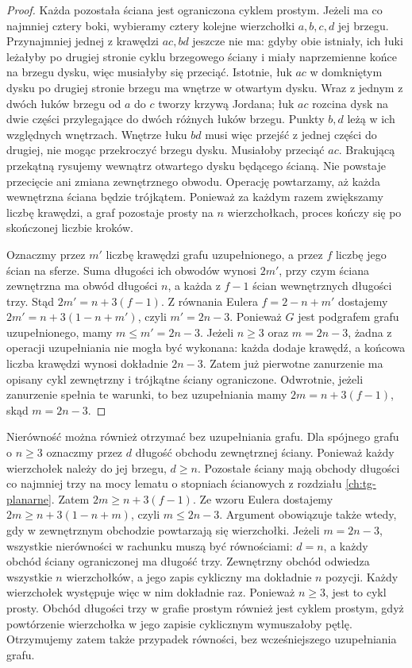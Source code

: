 \begin{proof}
Każda pozostała ściana jest ograniczona cyklem prostym.
Jeżeli ma co najmniej cztery boki, wybieramy cztery
kolejne wierzchołki $a,b,c,d$ jej brzegu.
Przynajmniej jednej z krawędzi $ac,bd$ jeszcze nie ma:
gdyby obie istniały, ich łuki leżałyby po drugiej
stronie cyklu brzegowego ściany i miały naprzemienne
końce na brzegu dysku, więc musiałyby się przeciąć. Istotnie, łuk $ac$
w domkniętym dysku po drugiej stronie brzegu
ma wnętrze w otwartym dysku. Wraz z jednym
z dwóch łuków brzegu od $a$ do $c$ tworzy
krzywą Jordana; łuk $ac$ rozcina dysk na dwie
części przylegające do dwóch różnych łuków
brzegu. Punkty $b,d$ leżą w ich względnych
wnętrzach. Wnętrze łuku $bd$ musi więc przejść
z jednej części do drugiej, nie mogąc przekroczyć
brzegu dysku. Musiałoby przeciąć $ac$. Brakującą przekątną rysujemy
wewnątrz otwartego dysku będącego ścianą. Nie powstaje
przecięcie ani zmiana zewnętrznego obwodu. Operację
powtarzamy, aż każda wewnętrzna ściana będzie trójkątem.
Ponieważ za każdym razem zwiększamy liczbę krawędzi,
a graf pozostaje prosty na $n$ wierzchołkach, proces
kończy się po skończonej liczbie kroków.

Oznaczmy przez $m'$ liczbę krawędzi grafu uzupełnionego,
a przez $f$ liczbę jego ścian na sferze.
Suma długości ich obwodów wynosi $2m'$, przy czym
ściana zewnętrzna ma obwód długości $n$,
a każda z $f-1$ ścian wewnętrznych długości trzy.
Stąd $2m'=n+3(f-1)$.
Z równania Eulera $f=2-n+m'$ dostajemy
$2m'=n+3(1-n+m')$, czyli $m'=2n-3$.
Ponieważ $G$ jest podgrafem grafu uzupełnionego,
mamy $m\leq m'=2n-3$.
Jeżeli $n\ge3$ oraz $m=2n-3$, żadna z operacji
uzupełniania nie mogła być wykonana: każda dodaje
krawędź, a końcowa liczba krawędzi wynosi dokładnie
$2n-3$. Zatem już pierwotne zanurzenie ma opisany
cykl zewnętrzny i trójkątne ściany ograniczone.
Odwrotnie, jeżeli zanurzenie spełnia te warunki,
to bez uzupełniania mamy $2m=n+3(f-1)$, skąd
$m=2n-3$.
\end{proof}

\begin{uwaga}
Nierówność można również otrzymać bez uzupełniania
grafu. Dla spójnego grafu o $n\geq3$ oznaczmy przez
$d$ długość obchodu zewnętrznej ściany. Ponieważ każdy
wierzchołek należy do jej brzegu, $d\geq n$.
Pozostałe ściany mają obchody długości co najmniej trzy
na mocy lematu o stopniach ścianowych z rozdziału
\ref{ch:tg-planarne}. Zatem $2m\geq n+3(f-1)$.
Ze wzoru Eulera dostajemy $2m\geq n+3(1-n+m)$,
czyli $m\leq2n-3$. Argument obowiązuje także wtedy,
gdy w zewnętrznym obchodzie powtarzają się wierzchołki.
Jeżeli $m=2n-3$, wszystkie nierówności
w rachunku muszą być równościami: $d=n$,
a każdy obchód ściany ograniczonej ma długość trzy.
Zewnętrzny obchód odwiedza wszystkie $n$ wierzchołków,
a jego zapis cykliczny ma dokładnie $n$ pozycji.
Każdy wierzchołek występuje więc w nim dokładnie raz.
Ponieważ $n\ge3$, jest to cykl prosty.
Obchód długości trzy w grafie prostym również
jest cyklem prostym, gdyż powtórzenie wierzchołka
w jego zapisie cyklicznym wymuszałoby pętlę.
Otrzymujemy zatem także przypadek równości,
bez wcześniejszego uzupełniania grafu.
\end{uwaga}

